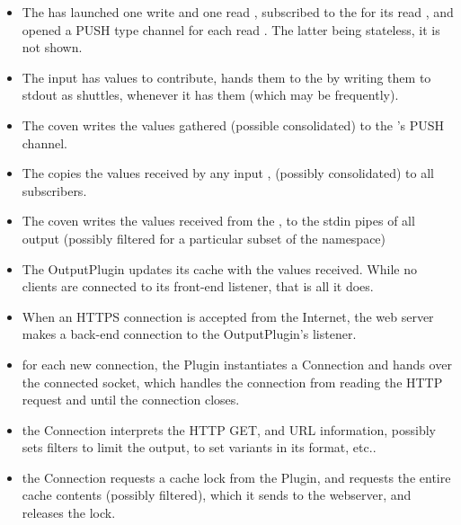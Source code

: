 \begin{itemize}

\item The \coven{} has launched one write and one read \witch{}, subscribed
to the \cauldron{} for its read \witch{}, and opened a PUSH type channel
for each read \witch{}. The latter being stateless, it is not shown.

\item The input \witch{} has values to contribute, hands them to the
\coven{} by writing them to stdout as \rawproto{} shuttles, whenever it
has them (which may be frequently).

\item The coven writes the values gathered (possible consolidated)
to the \cauldron{}'s PUSH channel.

\item The \cauldron{} copies the values received by any input \witches{},
(possibly consolidated) to all subscribers.

\item The coven{} writes the values received from the \cauldron{}, to
the stdin pipes of all output \witches{} (possibly filtered for a particular
subset of the namespace)

\item The \diffproto{}OutputPlugin updates its cache with the values
received.  While no clients are connected to its front-end listener,
that is all it does.

\item When an HTTPS connection is accepted from the Internet, the web
server makes a back-end connection to the \diffproto{}OutputPlugin's
listener.

\item for each new connection, the \diffproto{}Plugin instantiates
a \diffproto{}Connection and hands over the connected socket, which
handles the connection from reading the HTTP request and until the
connection closes.

\item the \diffproto{}Connection interprets the HTTP GET, and URL
information, possibly sets filters to limit the output, to set variants
in its format, etc..

\item the \diffproto{}Connection requests a cache lock from the
\diffproto{}Plugin, and requests the entire cache contents (possibly
filtered), which it sends to the webserver, and releases the lock.


\end{itemize}
